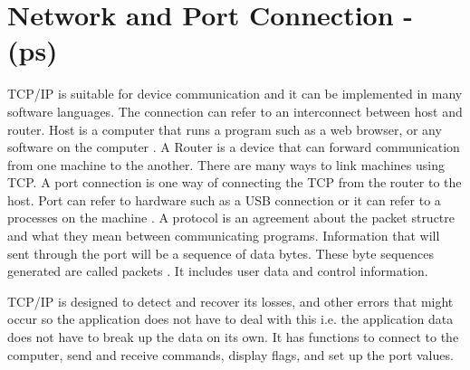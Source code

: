 
\section{Network and Port Connection - (ps)}

TCP/IP is suitable for device communication and it can be implemented in many software languages.
The connection can refer to an interconnect between host and router.
Host is a computer that runs a program such as a web browser, or any software on the computer \cite{davidB}.
A Router is a device that can forward communication from one machine to the another.
There are many ways to link machines using TCP.
A port connection is one way of connecting the TCP from the router to the host.
Port can refer to hardware such as a USB connection or it can refer to a processes on the machine \cite{normanM}.
A protocol is an agreement about the packet structre and what they mean between communicating programs.
Information that will sent through the port will be a sequence of data bytes. 
These byte sequences generated are called packets \cite{davidB}.
It includes user data and control information.

TCP/IP is designed to detect and recover its losses, and other errors that might occur so the application does not have to deal with this \cite{davidB} i.e. the application data does not have to break up the data on its own. It has functions to connect to the computer, send and receive commands, display flags, and set up the port values.


 
